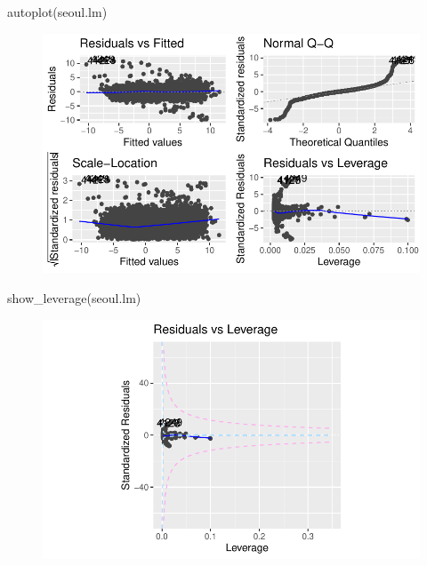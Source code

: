 \documentclass[
  letterpaper,
  DIV=11,
  numbers=noendperiod]{scrartcl}
\newenvironment{Shaded}{\begin{snugshade}}{\end{snugshade}}
\newcommand{\FunctionTok}[1]{\textcolor[rgb]{0.28,0.35,0.67}{#1}}
\newcommand{\NormalTok}[1]{\textcolor[rgb]{0.00,0.23,0.31}{#1}}
\begin{document}
\begin{Shaded}
\begin{Highlighting}[]
\FunctionTok{autoplot}\NormalTok{(seoul.lm)}
\end{Highlighting}
\end{Shaded}

\begin{figure}[H]

{\centering \includegraphics{seoul_files/figure-pdf/unnamed-chunk-9-1.pdf}

}

\end{figure}

\begin{Shaded}
\begin{Highlighting}[]
\FunctionTok{show\_leverage}\NormalTok{(seoul.lm)}
\end{Highlighting}
\end{Shaded}

\begin{figure}[H]

{\centering \includegraphics{seoul_files/figure-pdf/unnamed-chunk-9-2.pdf}

}

\end{figure}
\end{document}
